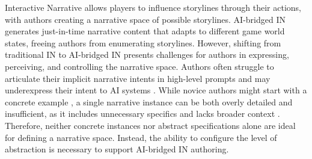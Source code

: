 Interactive Narrative allows players to influence storylines through their actions, with authors creating a narrative space of possible storylines.  AI-bridged IN generates just-in-time narrative content that adapts to different game world states, freeing authors from enumerating storylines. 
However, shifting from traditional IN to AI-bridged IN presents challenges for authors in expressing, perceiving, and controlling the narrative space. Authors often struggle to articulate their implicit narrative intents in high-level prompts \cite{mirowski2023co} and may underexpress their intent to AI systems \cite{kreminski2024intent}. While novice authors might start with a concrete example \cite{tomlinson2006learning,micallef2024use}, a single narrative instance can be both overly detailed and insufficient, as it includes unnecessary specifics and lacks broader context \cite{kreminski2024intent}. Therefore, neither concrete instances nor abstract specifications alone are ideal for defining a narrative space. Instead, the ability to configure the level of abstraction is necessary to support AI-bridged IN authoring. 

